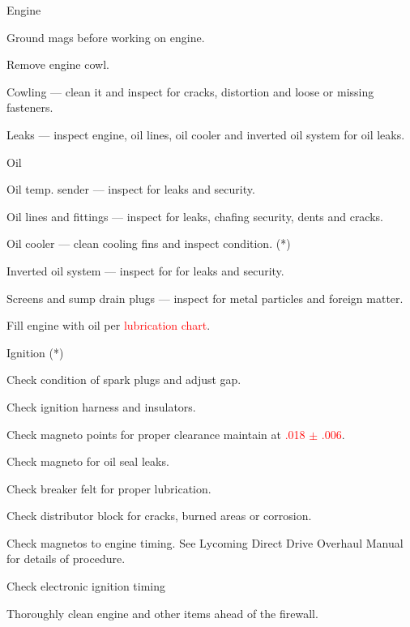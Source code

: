 \begin{enumerate*}
	\item{Engine} 
	\begin{Note}
		[WARNING] \centering Ground mags before working on engine. 
	\end{Note}
	\begin{enumerate*}
		\item Remove engine cowl.
		\item Cowling --- clean it and inspect for cracks, distortion and loose or missing fasteners.
		\item Leaks --- inspect engine, oil lines, oil cooler and inverted oil system for oil leaks.
		\item Oil 
		\begin{enumerate*}
			\item Oil temp. sender --- inspect for leaks and security. 
			\item Oil lines and fittings --- inspect for leaks, chafing security, dents and cracks. 
			\item Oil cooler --- clean cooling fins and inspect condition.  (*)
			\item Inverted oil system --- inspect for for leaks and security. 
			\item Screens and sump drain plugs --- inspect for metal particles and foreign matter.
			\item Fill engine with oil per \textcolor{red}{lubrication chart}. 
		\end{enumerate*}
		\item Ignition (*)
		\begin{enumerate*}
			\item Check condition of spark plugs and adjust gap. 
			\item Check ignition harness and insulators. 
			\item Check magneto points for proper clearance maintain at \textcolor{red}{.018 $\pm $ .006}. 
			\item Check magneto for oil seal leaks. 
			\item Check breaker felt for proper lubrication. 
			\item Check distributor block for cracks, burned areas or corrosion. 
			\item Check magnetos to engine timing. See Lycoming Direct Drive Overhaul Manual for details of procedure. 
			\item Check electronic ignition timing
		\end{enumerate*}
		\item Thoroughly clean engine and other items ahead of the firewall.

\end{enumerate*}
\end{enumerate*}
